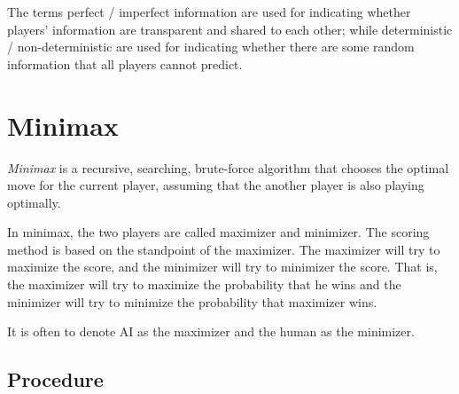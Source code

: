 \documentclass{note}
\begin{document}
\begin{tip}
    The terms perfect / imperfect information are used for indicating whether players' information are transparent and shared to each other; while deterministic / non-deterministic are used for indicating whether there are some random information that all players cannot predict.
\end{tip}

\section{Minimax}

\textit{Minimax} is a recursive, searching, brute-force algorithm that chooses the optimal move for the current player, assuming that the another player is also playing optimally.

In minimax, the two players are called maximizer and minimizer. The scoring method is based on the standpoint of the maximizer. The maximizer will try to maximize the score, and the minimizer will try to minimizer the score. That is, the maximizer will try to maximize the probability that he wins and the minimizer will try to minimize the probability that maximizer wins.

\begin{note}
    It is often to denote AI as the maximizer and the human as the minimizer.
\end{note}

\subsection{Procedure}
\end{document}
